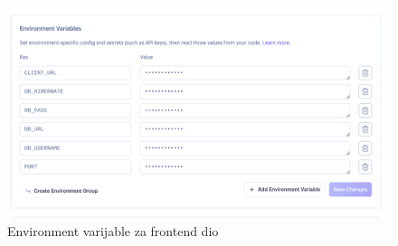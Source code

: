 			
			\begin{figure}[H]
			\includegraphics[scale=0.4]{slike/frontendEnvironment.PNG} %
			\centering
			\caption{Environment varijable za frontend dio}
			\label{fig:implementacija}
		\end{figure}
			
			\eject 